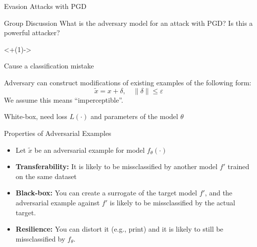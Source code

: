 \documentclass[10pt]{beamer}
\begin{document}
\begin{frame}{Evasion Attacks with PGD}
  \begin{alertblock}{Group Discussion}
    What is the adversary model for an attack with PGD? Is this a powerful attacker?
  \end{alertblock}

  \visible<+(1)->{
  \begin{description}[<+-| @alert+>]
    \item[Goals] Cause a classification mistake
    \item[Capabilities] Adversary can construct modifications of existing examples of the following
      form:
      \[ \tilde{x} = x + \delta, \quad \parallel \delta \parallel \leq \varepsilon \]
      We assume this means ``imperceptible''.
    \item[Knowledge] White-box, need loss $L(\cdot)$ and parameters of the model $\theta$
  \end{description}
  }
\end{frame}


\begin{frame}{Properties of Adversarial Examples}
  \begin{itemize}[<+-| @alert+>]
    \item Let $\tilde x$ be an adversarial example for model $f_\theta(\cdot)$
    \item \textbf{Transferability:} It is likely to be missclassified by another model $f'$ trained on
      the same dataset
    \item \textbf{Black-box:} You can create a surrogate of the target model $f'$, and the
      adversarial example against $f'$ is likely to be missclassified by the actual target.
    \item \textbf{Resilience:} You can distort it (e.g., print) and it is likely to still be
      missclassified by $f_\theta$.
  \end{itemize}
\end{frame}
\end{document}
